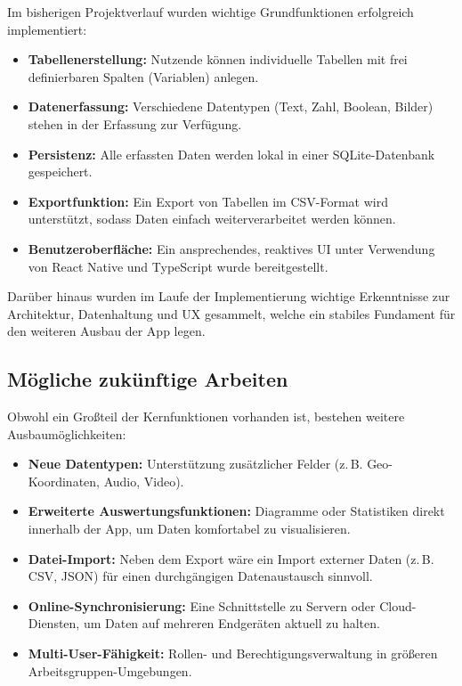 \documentclass[a4paper,12pt]{article}
\begin{document}
Im bisherigen Projektverlauf wurden wichtige Grundfunktionen erfolgreich implementiert:
\begin{itemize}[leftmargin=1.5cm]
    \item \textbf{Tabellenerstellung:} Nutzende können individuelle Tabellen mit frei definierbaren Spalten (Variablen) anlegen.
    \item \textbf{Datenerfassung:} Verschiedene Datentypen (Text, Zahl, Boolean, Bilder) stehen in der Erfassung zur Verfügung.
    \item \textbf{Persistenz:} Alle erfassten Daten werden lokal in einer SQLite-Datenbank gespeichert.
    \item \textbf{Exportfunktion:} Ein Export von Tabellen im CSV-Format wird unterstützt, sodass Daten einfach weiterverarbeitet werden können.
    \item \textbf{Benutzeroberfläche:} Ein ansprechendes, reaktives UI unter Verwendung von React Native und TypeScript wurde bereitgestellt.
\end{itemize}

Darüber hinaus wurden im Laufe der Implementierung wichtige Erkenntnisse zur Architektur, Datenhaltung und UX gesammelt, welche ein stabiles Fundament für den weiteren Ausbau der App legen.

\subsection{Mögliche zukünftige Arbeiten}
Obwohl ein Großteil der Kernfunktionen vorhanden ist, bestehen weitere Ausbaumöglichkeiten:
\begin{itemize}[leftmargin=1.5cm]
    \item \textbf{Neue Datentypen:} Unterstützung zusätzlicher Felder (z.\,B. Geo-Koordinaten, Audio, Video).
    \item \textbf{Erweiterte Auswertungsfunktionen:} Diagramme oder Statistiken direkt innerhalb der App, um Daten komfortabel zu visualisieren.
    \item \textbf{Datei-Import:} Neben dem Export wäre ein Import externer Daten (z.\,B. CSV, JSON) für einen durchgängigen Datenaustausch sinnvoll.
    \item \textbf{Online-Synchronisierung:} Eine Schnittstelle zu Servern oder Cloud-Diensten, um Daten auf mehreren Endgeräten aktuell zu halten.
    \item \textbf{Multi-User-Fähigkeit:} Rollen- und Berechtigungsverwaltung in größeren Arbeitsgruppen-Umgebungen.
\end{itemize}
\end{document}
